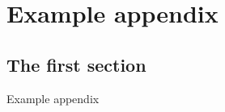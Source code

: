 \chapter{Example appendix}
\label{chap:appendix}
\newpage

\section{The first section}
\label{sec:appsec1}

Example appendix
